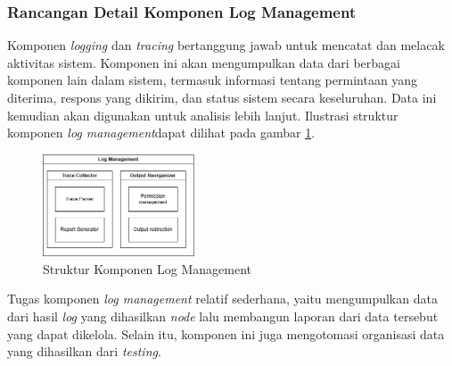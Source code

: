 \subsubsection{Rancangan Detail Komponen Log Management}
\label{subsubsection:detail-data-log-management}

Komponen \textit{logging} dan \textit{tracing} bertanggung jawab untuk mencatat dan melacak aktivitas sistem. Komponen ini akan mengumpulkan data dari berbagai komponen lain dalam sistem, termasuk informasi tentang permintaan yang diterima, respons yang dikirim, dan status sistem secara keseluruhan. Data ini kemudian akan digunakan untuk analisis lebih lanjut. Ilustrasi struktur komponen \textit{log management}dapat dilihat pada gambar \ref{fig:log-management-structure}.

\begin{figure}[ht]
    \centering
    \includegraphics[width=0.4\textwidth]{resources/chapter-3/log-management-architecture.png}
    \caption{Struktur Komponen Log Management}
    \label{fig:log-management-structure}
\end{figure}

Tugas komponen \textit{log management} relatif sederhana, yaitu mengumpulkan data dari hasil \textit{log} yang dihasilkan \textit{node} lalu membangun laporan dari data tersebut yang dapat dikelola. Selain itu, komponen ini juga mengotomasi organisasi data yang dihasilkan dari \textit{testing}.